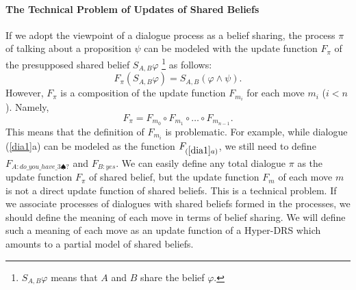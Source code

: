 \paragraph{The Technical Problem of Updates of Shared Beliefs}
If we adopt the viewpoint of a dialogue process as a belief sharing,
the process $\pi$ of talking about a proposition $\psi$ can be modeled with the update function $F_{\pi}$ of the presupposed shared belief $S_{A,B}\varphi$
\<\footnote{$S_{A,B}\varphi$ means that $A$ and $B$ share the belief $\varphi$.}
 as follows:
$$F_{\pi}(S_{A,B}\varphi)=S_{A,B}(\varphi\wedge\psi).$$
However, $F_{\pi}$ is a composition of the update function $F_{m_i}$ for each move $m_i$ ($i<n$).
Namely,
$$F_{\pi}=F_{m_0}\circ F_{m_1}\circ \ldots \circ F_{m_{n-1}}.$$
This means that the definition of $F_{m_i}$ is problematic.
For example, while dialogue (\ref{dia1}a) can be modeled as the function $F_{(\ref{dia1}a)}$,
we still need to define $F_{A:do\_you\_have\_3\spadesuit?}$ and $F_{B:yes}$.
We can easily define any total dialogue $\pi$ as the update function $F_{\pi}$ of shared belief, but the update function $F_{m}$ of each move $m$ is not a direct update function of shared beliefs.
This is a technical problem.
If we associate processes of dialogues with shared beliefs formed in the processes, we should define the meaning of each move in terms of belief sharing.
We will define such a meaning of each move as an update function of a  Hyper-DRS which amounts to a partial model of shared beliefs.
